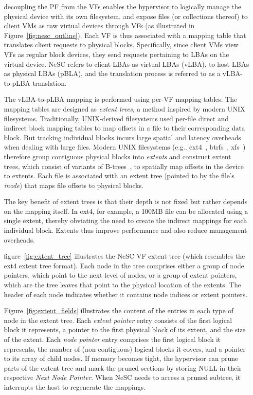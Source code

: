decoupling the PF from the VFs enables the hypervisor to logically manage the physical device with its own filesystem, and expose files (or collections thereof) to client VMs as raw virtual devices through VFs (as illustrated in Figure~\ref{fig:nesc_outline}). Each VF is thus associated with a mapping table that translates client requests to physical blocks. Specifically, since client VMs view VFs as regular block devices, they send requests pertaining to LBAs on the virtual device. NeSC refers to client LBAs as virtual LBAs (vLBA), to host LBAs as physical LBAs (pBLA), and the translation process is referred to as a vLBA-to-pLBA translation.

The vLBA-to-pLBA mapping is performed using per-VF mapping tables. The mapping tables are designed as \emph{extent trees}, a method inspired by modern UNIX filesystems.
%
Traditionally, UNIX-derived filesystems used per-file direct and indirect  block mapping tables to map offsets in a file to their corresponding data block. But tracking individual blocks incurs large spatial and latency overheads when dealing with large files. Modern UNIX filesystems (e.g., ext4~\cite{mathur07ext4}, btrfs~\cite{rodeh13btrfs}, xfs~\cite{sweeney96xfs}) therefore group contiguous physical blocks into \emph{extents} and construct extent trees, which consist of variants of B-trees~\cite{comer79btree}, to spatially map offsets in the device to extents.
Each file is associated with an extent tree (pointed to by the file's \emph{inode}) that maps file offsets to physical blocks.

The key benefit of extent trees is that their depth is not fixed but rather depends on the mapping itself. In ext4, for example, a 100MB file can be allocated using a single extent, thereby obviating the need to create the indirect mappings for each individual block. Extents thus improve performance and also reduce management overheads.

figure~\ref{fig:extent_tree} illustrates the NeSC VF extent tree (which resembles the ext4 extent tree format). Each node in the tree comprises either a group of node pointers, which point to the next level of nodes, or a group of extent pointers, which are the tree leaves that point to the physical location of the extents. The header of each node indicates whether it contains node indices or extent pointers. 
 
Figure~\ref{fig:extent_fields} illustrates the content of the entries in each type of node in the extent tree. Each \emph{extent pointer} entry consists of the first logical block it represents, a pointer to the first physical block of its extent, and the size of the extent. Each \emph{node pointer} entry comprises the first logical block it represents, the number of (non-contiguous) logical blocks it covers, and a pointer to its array of child nodes.
%
If memory becomes tight, the hypervisor can prune parts of the extent tree and mark the pruned sections by storing NULL in their respective \emph{Next Node Pointer}. When NeSC needs to access a pruned subtree, it interrupts the host to regenerate the mappings.

